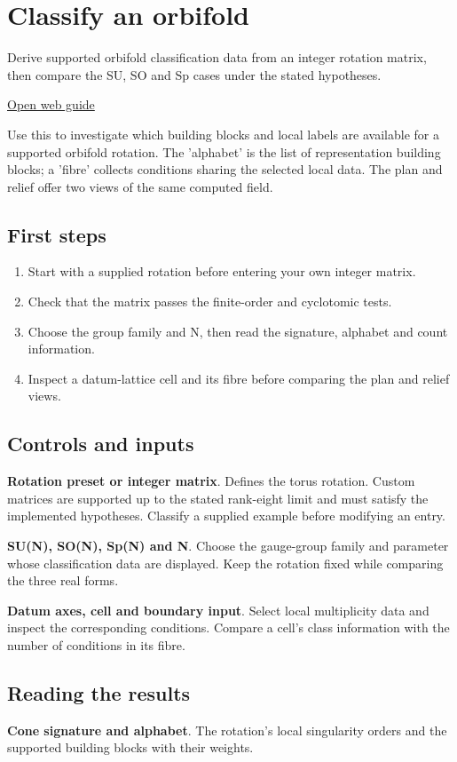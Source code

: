 \documentclass[11pt,a4paper]{article}
\begin{document}
\section{Classify an orbifold}
Derive supported orbifold classification data from an integer rotation matrix, then compare the SU, SO and Sp cases under the stated hypotheses.

\href{https://karlesmarin.github.io/ghu-explorer/guide/orbifold/index.html}{Open web guide}

Use this to investigate which building blocks and local labels are available for a supported orbifold rotation. The 'alphabet' is the list of representation building blocks; a 'fibre' collects conditions sharing the selected local data. The plan and relief offer two views of the same computed field.
\subsection*{First steps}
\begin{enumerate}
\item Start with a supplied rotation before entering your own integer matrix.
\item Check that the matrix passes the finite-order and cyclotomic tests.
\item Choose the group family and N, then read the signature, alphabet and count information.
\item Inspect a datum-lattice cell and its fibre before comparing the plan and relief views.
\end{enumerate}
\subsection*{Controls and inputs}
\textbf{Rotation preset or integer matrix}. Defines the torus rotation. Custom matrices are supported up to the stated rank-eight limit and must satisfy the implemented hypotheses. Classify a supplied example before modifying an entry.

\textbf{SU(N), SO(N), Sp(N) and N}. Choose the gauge-group family and parameter whose classification data are displayed. Keep the rotation fixed while comparing the three real forms.

\textbf{Datum axes, cell and boundary input}. Select local multiplicity data and inspect the corresponding conditions. Compare a cell's class information with the number of conditions in its fibre.

\subsection*{Reading the results}
\textbf{Cone signature and alphabet}. The rotation's local singularity orders and the supported building blocks with their weights.
\end{document}
